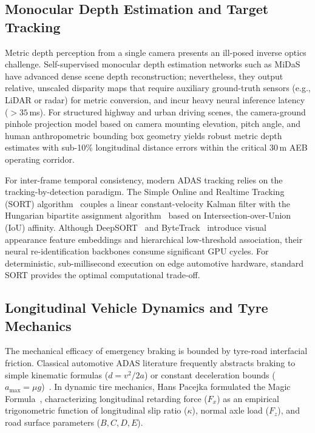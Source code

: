 \documentclass[3p,twocolumn]{elsarticle}
\begin{document}
\subsection{Monocular Depth Estimation and Target Tracking}
Metric depth perception from a single camera presents an ill-posed inverse optics challenge. Self-supervised monocular depth estimation networks such as MiDaS~\cite{ranftl2022} have advanced dense scene depth reconstruction; nevertheless, they output relative, unscaled disparity maps that require auxiliary ground-truth sensors (e.g., LiDAR or radar) for metric conversion, and incur heavy neural inference latency ($>35$\,ms). For structured highway and urban driving scenes, the camera-ground pinhole projection model based on camera mounting elevation, pitch angle, and human anthropometric bounding box geometry yields robust metric depth estimates with sub-10\% longitudinal distance errors within the critical 30\,m AEB operating corridor.

For inter-frame temporal consistency, modern ADAS tracking relies on the tracking-by-detection paradigm. The Simple Online and Realtime Tracking (SORT) algorithm~\cite{bewley2016} couples a linear constant-velocity Kalman filter with the Hungarian bipartite assignment algorithm~\cite{kuhn1955} based on Intersection-over-Union (IoU) affinity. Although DeepSORT~\cite{wojke2017} and ByteTrack~\cite{zhang2022} introduce visual appearance feature embeddings and hierarchical low-threshold association, their neural re-identification backbones consume significant GPU cycles. For deterministic, sub-millisecond execution on edge automotive hardware, standard SORT provides the optimal computational trade-off.

\subsection{Longitudinal Vehicle Dynamics and Tyre Mechanics}
The mechanical efficacy of emergency braking is bounded by tyre-road interfacial friction. Classical automotive ADAS literature frequently abstracts braking to simple kinematic formulas ($d = v^2/2a$) or constant deceleration bounds ($a_{\text{max}} = \mu g$)~\cite{seiniger2012}. In dynamic tire mechanics, Hans Pacejka formulated the Magic Formula~\cite{pacejka1992,pacejka2005}, characterizing longitudinal retarding force ($F_x$) as an empirical trigonometric function of longitudinal slip ratio ($\kappa$), normal axle load ($F_z$), and road surface parameters ($B, C, D, E$). 
\end{document}

